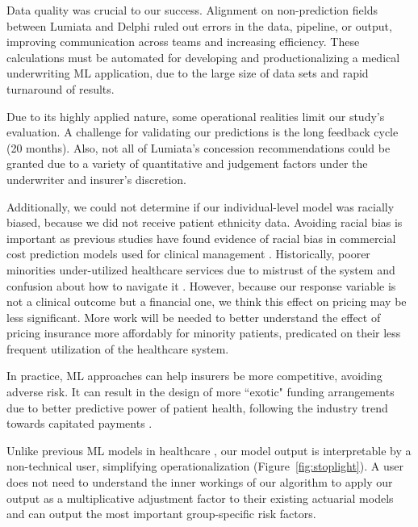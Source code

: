 \documentclass[letterpaper]{article} %
\begin{document}
Data quality was crucial to our success. Alignment on non-prediction fields between Lumiata and Delphi ruled out errors in the data, pipeline, or output, improving communication across teams and increasing efficiency. These calculations must be automated for developing and productionalizing a medical underwriting ML application, due to the large size of data sets and rapid turnaround of results.

Due to its highly applied nature, some operational realities limit our study's evaluation. A challenge for validating our predictions is the long feedback cycle (20 months). Also, not all of Lumiata's concession recommendations could be granted due to a variety of quantitative and judgement factors under the underwriter and insurer's discretion. 

Additionally, we could not determine if our individual-level model was racially biased, because we did not receive patient ethnicity data.  Avoiding racial bias is important as previous studies have found evidence of racial bias in commercial cost prediction models used for clinical management \cite{RacialBias}.  Historically, poorer minorities under-utilized healthcare services due to mistrust of the system and confusion about how to navigate it \cite{RacialBias}. However, because our response variable is not a clinical outcome but a financial one, we think this effect on pricing may be less significant.  More work will be needed to better understand the effect of pricing insurance more affordably for minority patients, predicated on their less frequent utilization of the healthcare system.

In practice, ML approaches can help insurers be more competitive, avoiding adverse risk. It can result in the design of more ``exotic" funding arrangements due to better predictive power of patient health, following the industry trend towards capitated payments \cite{mngdcare}.

Unlike previous ML models in healthcare \cite{xai}, our model output is interpretable by a non-technical user, simplifying operationalization (Figure~\ref{fig:stoplight}). A user does not need to understand the inner workings of our algorithm to apply our output as a multiplicative adjustment factor to their existing actuarial models and can output the most important group-specific risk factors.
\end{document}
